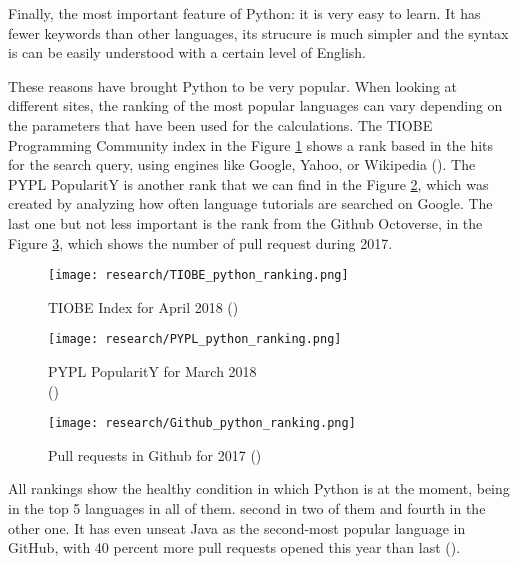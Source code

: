 Finally, the most important feature of Python: it is very easy to learn. It has fewer keywords than other languages, its strucure is much simpler and the syntax is can be easily understood with a certain level of English. 

These reasons have brought Python to be very popular. When looking at different sites, the ranking of the most popular languages can vary depending on the parameters that have been used for the calculations. The TIOBE Programming Community index in the Figure \ref{fig:tiobe_rank} shows a rank based in the hits for the search query, using engines like Google, Yahoo, or Wikipedia (\cite{tiobe_index_def}). The PYPL PopularitY is another rank that we can find in the Figure \ref{fig:pypl_rank}, which was created by analyzing how often language tutorials are searched on Google. The last one but not less important is the rank from the Github Octoverse, in the Figure \ref{fig:github_octoverse_rank}, which shows the number of pull request during 2017.

\begin{figure}[!ht]
	\centering
	\texttt{[image: research/TIOBE\_python\_ranking.png]}
	\caption{TIOBE Index for April 2018 (\cite{tiobe_index})}
	\label{fig:tiobe_rank}
\end{figure}

\begin{figure}[!ht]
	\centering
	\texttt{[image: research/PYPL\_python\_ranking.png]}
	\caption{PYPL PopularitY for March 2018 \\(\cite{pypl_pop_rank})}
	\label{fig:pypl_rank}
\end{figure}

\begin{figure}[!ht]
	\centering
	\texttt{[image: research/Github\_python\_ranking.png]}
	\caption{Pull requests in Github for 2017 (\cite{octoverse_2017})}
	\label{fig:github_octoverse_rank}
\end{figure}

All rankings show the healthy condition in which Python is at the moment, being in the top 5 languages in all of them. second in two of them and fourth in the other one. It has even unseat Java as the second-most popular language in GitHub, with 40 percent more pull requests opened this year than last (\cite{octoverse_2017}). 